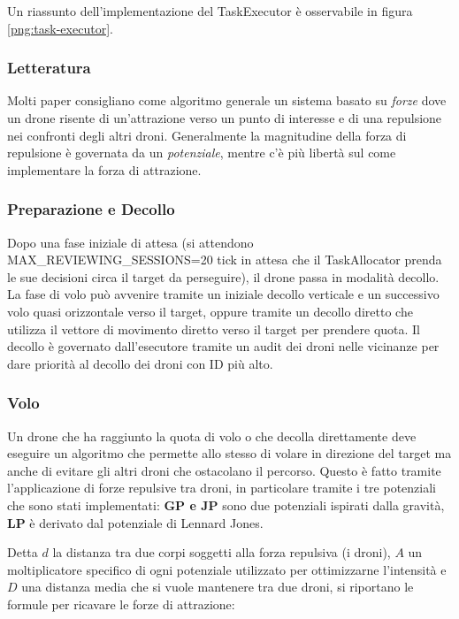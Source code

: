 \documentclass[a4paper,11pt,oneside, table]{article}
\begin{document}
Un riassunto dell'implementazione del TaskExecutor \`e osservabile in figura \ref{png:task-executor}.

\subsubsection{Letteratura}

Molti paper consigliano come algoritmo generale un sistema basato su \textit{forze} dove un drone risente di un'attrazione verso un punto di interesse e di una repulsione nei confronti degli altri droni.
Generalmente la magnitudine della forza di repulsione \`e governata da un \textit{potenziale}, mentre c'\`e pi\`u libert\`a sul come implementare la forza di attrazione.

\subsubsection{Preparazione e Decollo}

Dopo una fase iniziale di attesa (si attendono MAX\_REVIEWING\_SESSIONS=20 tick in attesa che il TaskAllocator prenda le sue decisioni circa il target da perseguire), il drone passa in modalit\`a decollo. La fase di volo pu\`o avvenire tramite un iniziale decollo verticale e un successivo volo quasi orizzontale verso il target, oppure tramite un decollo diretto che utilizza il vettore di movimento diretto verso il target per prendere quota.
Il decollo \`e governato dall'esecutore tramite un audit dei droni nelle vicinanze per dare priorit\`a al decollo dei droni con ID pi\`u alto.

\subsubsection{Volo}

Un drone che ha raggiunto la quota di volo o che decolla direttamente deve eseguire un algoritmo che permette allo stesso di volare in direzione del target ma anche di evitare gli altri droni che ostacolano il percorso.
Questo \`e fatto tramite l'applicazione di forze repulsive tra droni, in particolare tramite i tre potenziali che sono stati implementati: \textbf{GP e JP} sono due potenziali ispirati dalla gravit\`a, \textbf{LP} \`e derivato dal potenziale di Lennard Jones.

Detta $d$ la distanza tra due corpi soggetti alla forza repulsiva (i droni), $A$ un moltiplicatore specifico di ogni potenziale utilizzato per ottimizzarne l'intensit\`a e $D$ una distanza media che si vuole mantenere tra due droni, si riportano le formule per ricavare le forze di attrazione:
\end{document}

